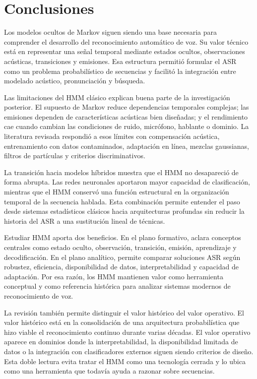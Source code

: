 \section{Conclusiones}
Los modelos ocultos de Markov siguen siendo una base necesaria para comprender el desarrollo del reconocimiento automático de voz. Su valor técnico está en representar una señal temporal mediante estados ocultos, observaciones acústicas, transiciones y emisiones. Esa estructura permitió formular el ASR como un problema probabilístico de secuencias y facilitó la integración entre modelado acústico, pronunciación y búsqueda.

Las limitaciones del HMM clásico explican buena parte de la investigación posterior. El supuesto de Markov reduce dependencias temporales complejas; las emisiones dependen de características acústicas bien diseñadas; y el rendimiento cae cuando cambian las condiciones de ruido, micrófono, hablante o dominio. La literatura revisada respondió a esos límites con compensación acústica, entrenamiento con datos contaminados, adaptación en línea, mezclas gaussianas, filtros de partículas y criterios discriminativos.

La transición hacia modelos híbridos muestra que el HMM no desapareció de forma abrupta. Las redes neuronales aportaron mayor capacidad de clasificación, mientras que el HMM conservó una función estructural en la organización temporal de la secuencia hablada. Esta combinación permite entender el paso desde sistemas estadísticos clásicos hacia arquitecturas profundas sin reducir la historia del ASR a una sustitución lineal de técnicas.

Estudiar HMM aporta dos beneficios. En el plano formativo, aclara conceptos centrales como estado oculto, observación, transición, emisión, aprendizaje y decodificación. En el plano analítico, permite comparar soluciones ASR según robustez, eficiencia, disponibilidad de datos, interpretabilidad y capacidad de adaptación. Por esa razón, los HMM mantienen valor como herramienta conceptual y como referencia histórica para analizar sistemas modernos de reconocimiento de voz.

La revisión también permite distinguir el valor histórico del valor operativo. El valor histórico está en la consolidación de una arquitectura probabilística que hizo viable el reconocimiento continuo durante varias décadas. El valor operativo aparece en dominios donde la interpretabilidad, la disponibilidad limitada de datos o la integración con clasificadores externos siguen siendo criterios de diseño. Esta doble lectura evita tratar el HMM como una tecnología cerrada y lo ubica como una herramienta que todavía ayuda a razonar sobre secuencias.

